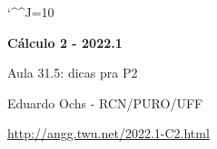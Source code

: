 \documentclass[oneside,12pt]{article}
\begin{document}
\catcode`\^^J=10
\pu
\def\pictgridstyle{\color{GrayPale}\linethickness{0.3pt}}
\def\pictaxesstyle{\linethickness{0.5pt}}
\def\pictnaxesstyle{\color{GrayPale}\linethickness{0.5pt}}
\celllower=2.5pt


\def\u#1{\par{\footnotesize \url{#1}}}

\def\drafturl{http://angg.twu.net/LATEX/2022-1-C2.pdf}
\def\drafturl{http://angg.twu.net/2022.1-C2.html}
\def\draftfooter{\tiny \href{\drafturl}{\jobname{}} \ColorBrown{\shorttoday{} \hours}}



%

\thispagestyle{empty}

\begin{center}

\vspace*{1.2cm}

{\bf \Large Cálculo 2 - 2022.1}

\bsk

Aula 31.5: dicas pra P2

\bsk

Eduardo Ochs - RCN/PURO/UFF

\url{http://angg.twu.net/2022.1-C2.html}

\end{center}

\newpage


\end{document}
